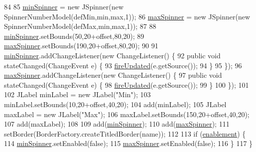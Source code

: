 \begin{DoxyCode}
84         
85         \mbox{\hyperlink{classorg_1_1newdawn_1_1slick_1_1tools_1_1peditor_1_1_min_max_panel_ae09b9ecc2a254d7a74044bb20b6b62e6}{minSpinner}} = \textcolor{keyword}{new} JSpinner(\textcolor{keyword}{new} SpinnerNumberModel(defMin,min,max,1));
86         \mbox{\hyperlink{classorg_1_1newdawn_1_1slick_1_1tools_1_1peditor_1_1_min_max_panel_a9e445c1f2ecd3c64e93ec8bf69f639f9}{maxSpinner}} = \textcolor{keyword}{new} JSpinner(\textcolor{keyword}{new} SpinnerNumberModel(defMax,min,max,1));
87         
88         \mbox{\hyperlink{classorg_1_1newdawn_1_1slick_1_1tools_1_1peditor_1_1_min_max_panel_ae09b9ecc2a254d7a74044bb20b6b62e6}{minSpinner}}.setBounds(50,20+offset,80,20);
89         \mbox{\hyperlink{classorg_1_1newdawn_1_1slick_1_1tools_1_1peditor_1_1_min_max_panel_a9e445c1f2ecd3c64e93ec8bf69f639f9}{maxSpinner}}.setBounds(190,20+offset,80,20);
90         
91         \mbox{\hyperlink{classorg_1_1newdawn_1_1slick_1_1tools_1_1peditor_1_1_min_max_panel_ae09b9ecc2a254d7a74044bb20b6b62e6}{minSpinner}}.addChangeListener(\textcolor{keyword}{new} ChangeListener() \{
92             \textcolor{keyword}{public} \textcolor{keywordtype}{void} stateChanged(ChangeEvent e) \{
93                 \mbox{\hyperlink{classorg_1_1newdawn_1_1slick_1_1tools_1_1peditor_1_1_min_max_panel_a644b9b3a4aba513423b79140a87e362e}{fireUpdated}}(e.getSource());
94             \}
95         \});
96         \mbox{\hyperlink{classorg_1_1newdawn_1_1slick_1_1tools_1_1peditor_1_1_min_max_panel_a9e445c1f2ecd3c64e93ec8bf69f639f9}{maxSpinner}}.addChangeListener(\textcolor{keyword}{new} ChangeListener() \{
97             \textcolor{keyword}{public} \textcolor{keywordtype}{void} stateChanged(ChangeEvent e) \{
98                 \mbox{\hyperlink{classorg_1_1newdawn_1_1slick_1_1tools_1_1peditor_1_1_min_max_panel_a644b9b3a4aba513423b79140a87e362e}{fireUpdated}}(e.getSource());
99             \}
100         \});
101         
102         JLabel minLabel = \textcolor{keyword}{new} JLabel(\textcolor{stringliteral}{"Min"});
103         minLabel.setBounds(10,20+offset,40,20);
104         add(minLabel);
105         JLabel maxLabel = \textcolor{keyword}{new} JLabel(\textcolor{stringliteral}{"Max"});
106         maxLabel.setBounds(150,20+offset,40,20);
107         add(maxLabel);
108         
109         add(\mbox{\hyperlink{classorg_1_1newdawn_1_1slick_1_1tools_1_1peditor_1_1_min_max_panel_ae09b9ecc2a254d7a74044bb20b6b62e6}{minSpinner}});
110         add(\mbox{\hyperlink{classorg_1_1newdawn_1_1slick_1_1tools_1_1peditor_1_1_min_max_panel_a9e445c1f2ecd3c64e93ec8bf69f639f9}{maxSpinner}});
111         setBorder(BorderFactory.createTitledBorder(name));
112         
113         \textcolor{keywordflow}{if} (\mbox{\hyperlink{classorg_1_1newdawn_1_1slick_1_1tools_1_1peditor_1_1_min_max_panel_a82cdf912c2f081581d288b771c431703}{enablement}}) \{
114             \mbox{\hyperlink{classorg_1_1newdawn_1_1slick_1_1tools_1_1peditor_1_1_min_max_panel_ae09b9ecc2a254d7a74044bb20b6b62e6}{minSpinner}}.setEnabled(\textcolor{keyword}{false});
115             \mbox{\hyperlink{classorg_1_1newdawn_1_1slick_1_1tools_1_1peditor_1_1_min_max_panel_a9e445c1f2ecd3c64e93ec8bf69f639f9}{maxSpinner}}.setEnabled(\textcolor{keyword}{false});
116         \}
117     \}
\end{DoxyCode}


